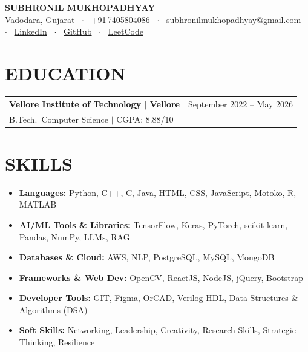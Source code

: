 \documentclass[11pt,letterpaper]{article}
\makeatletter
\newcommand{\eduentry}[4]{%
  \vspace{4pt}
  \noindent
  \begin{tabular*}{\textwidth}{@{}l@{\extracolsep{\fill}}r@{}}
    \textbf{#1} & {\small #2}\\
    {\small #3} & {\small #4}
  \end{tabular*}%
  \vspace{-2pt}
}
\makeatother
\begin{document}
\begin{center}
  {\Large\bfseries SUBHRONIL MUKHOPADHYAY}\\[4pt]
  \small
  Vadodara, Gujarat
  ~$\cdot$~
  +91\,7405804086
  ~$\cdot$~
  \href{mailto:subhronilmukhopadhyay@gmail.com}{subhronilmukhopadhyay@gmail.com}
  ~$\cdot$~
  \href{http://linkedin.com/in/subhronil-mukhopadhyay}{LinkedIn}
  ~$\cdot$~
  \href{http://github.com/Subhronilmukhopadhyay}{GitHub}
  ~$\cdot$~
  \href{https://leetcode.com/u/subhronilmukhopadhyay/}{LeetCode}
\end{center}
\vspace{-8pt}

\section{EDUCATION}
\eduentry
  {Vellore Institute of Technology \textnormal{$|$ Vellore}}
  {September 2022 -- May 2026}
  {B.Tech.\ Computer Science \textnormal{$|$ CGPA: 8.88/10}}
  {}

\section{SKILLS}
\begin{itemize}[leftmargin=0.05in, label={}, itemsep=0pt, topsep=2pt]
  \item \textbf{Languages:} Python, C++, C, Java, HTML, CSS, JavaScript, Motoko, R, MATLAB
  \item \textbf{AI/ML Tools \& Libraries:} TensorFlow, Keras, PyTorch, scikit-learn, Pandas, NumPy, LLMs, RAG
  \item \textbf{Databases \& Cloud:} AWS, NLP, PostgreSQL, MySQL, MongoDB
  \item \textbf{Frameworks \& Web Dev:} OpenCV, ReactJS, NodeJS, jQuery, Bootstrap
  \item \textbf{Developer Tools:} GIT, Figma, OrCAD, Verilog HDL, Data Structures \& Algorithms (DSA)
  \item \textbf{Soft Skills:} Networking, Leadership, Creativity, Research Skills, Strategic Thinking, Resilience
\end{itemize}
\vspace{-2pt}
\end{document}
